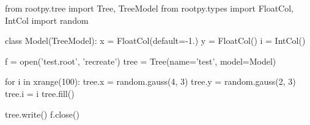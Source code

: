 \begin{footnotesize}
\begin{pyglist}[language=python,texcl=true,abovecaptionskip=0,style=vs,bgcolor=Moccasin]
from rootpy.tree import Tree, TreeModel
from rootpy.types import FloatCol, IntCol
import random

class Model(TreeModel):
    x = FloatCol(default=-1.)
    y = FloatCol()
    i = IntCol()

f = open('test.root', 'recreate')
tree = Tree(name='test', model=Model)

for i in xrange(100):
    tree.x = random.gauss(4, 3)
    tree.y = random.gauss(2, 3)
    tree.i = i
    tree.fill()

tree.write()
f.close()
\end{pyglist}
\end{footnotesize}
